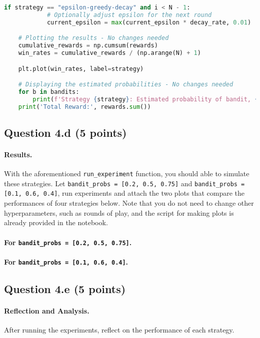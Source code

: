 \documentclass[12pt]{article}
\begin{document}
\begin{solution}
\begin{lstlisting}[language=Python]
        if strategy == "epsilon-greedy-decay" and i < N - 1:
            # Optionally adjust epsilon for the next round
            current_epsilon = max(current_epsilon * decay_rate, 0.01)  # Ensure epsilon does not become too small

    # Plotting the results - No changes needed
    cumulative_rewards = np.cumsum(rewards)
    win_rates = cumulative_rewards / (np.arange(N) + 1)

    plt.plot(win_rates, label=strategy)

    # Displaying the estimated probabilities - No changes needed
    for b in bandits:
        print(f'Strategy {strategy}: Estimated probability of bandit, {b.p_estimate}')
    print('Total Reward:', rewards.sum())
\end{lstlisting}
\end{solution}

\subsection*{Question 4.d (5 points) } 
\paragraph{Results.}
With the aforementioned \texttt{run\_experiment} function, you should able to simulate these strategies. Let \texttt{bandit\_probs = [0.2, 0.5, 0.75]} and \texttt{bandit\_probs = [0.1, 0.6, 0.4]}, run experiments and attach the two plots that compare the performances of four strategies below. Note that you do not need to change other hyperparameters, such as rounds of play, and the script for making plots is already provided in the notebook.

\paragraph{For \texttt{bandit\_probs = [0.2, 0.5, 0.75]}.}
\begin{solution}


\end{solution}

\paragraph{For \texttt{bandit\_probs = [0.1, 0.6, 0.4]}.}
\begin{solution}

\end{solution}

\subsection*{Question 4.e (5 points) } 
\paragraph{Reflection and Analysis.}
After running the experiments, reflect on the performance of each strategy.
\begin{solution}

\end{solution}
\end{document}
